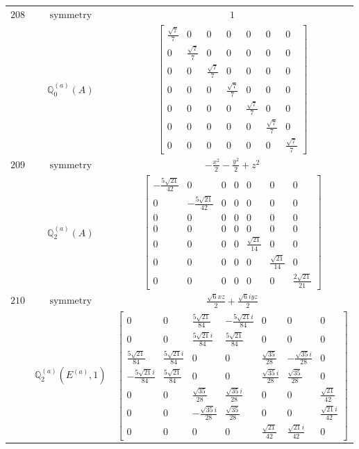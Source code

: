 \documentclass[fleqn,8pt,landscape]{jsarticle}
\begin{document}
\begin{longtable}{ccc}
$ 208 $ & $ \text{symmetry} $ & $ 1 $ \\
$  $ & $ \mathbb{Q}_{0}^{(a)}(A) $ & $ \begin{bmatrix} \frac{\sqrt{7}}{7} & 0 & 0 & 0 & 0 & 0 & 0 \\ 0 & \frac{\sqrt{7}}{7} & 0 & 0 & 0 & 0 & 0 \\ 0 & 0 & \frac{\sqrt{7}}{7} & 0 & 0 & 0 & 0 \\ 0 & 0 & 0 & \frac{\sqrt{7}}{7} & 0 & 0 & 0 \\ 0 & 0 & 0 & 0 & \frac{\sqrt{7}}{7} & 0 & 0 \\ 0 & 0 & 0 & 0 & 0 & \frac{\sqrt{7}}{7} & 0 \\ 0 & 0 & 0 & 0 & 0 & 0 & \frac{\sqrt{7}}{7} \end{bmatrix} $ \\ \hline
$ 209 $ & $ \text{symmetry} $ & $ - \frac{x^{2}}{2} - \frac{y^{2}}{2} + z^{2} $ \\
$  $ & $ \mathbb{Q}_{2}^{(a)}(A) $ & $ \begin{bmatrix} - \frac{5 \sqrt{21}}{42} & 0 & 0 & 0 & 0 & 0 & 0 \\ 0 & - \frac{5 \sqrt{21}}{42} & 0 & 0 & 0 & 0 & 0 \\ 0 & 0 & 0 & 0 & 0 & 0 & 0 \\ 0 & 0 & 0 & 0 & 0 & 0 & 0 \\ 0 & 0 & 0 & 0 & \frac{\sqrt{21}}{14} & 0 & 0 \\ 0 & 0 & 0 & 0 & 0 & \frac{\sqrt{21}}{14} & 0 \\ 0 & 0 & 0 & 0 & 0 & 0 & \frac{2 \sqrt{21}}{21} \end{bmatrix} $ \\ \hline
$ 210 $ & $ \text{symmetry} $ & $ \frac{\sqrt{6} x z}{2} + \frac{\sqrt{6} i y z}{2} $ \\
$  $ & $ \mathbb{Q}_{2}^{(a)}(E^{(a)},1) $ & $ \begin{bmatrix} 0 & 0 & \frac{5 \sqrt{21}}{84} & - \frac{5 \sqrt{21} i}{84} & 0 & 0 & 0 \\ 0 & 0 & \frac{5 \sqrt{21} i}{84} & \frac{5 \sqrt{21}}{84} & 0 & 0 & 0 \\ \frac{5 \sqrt{21}}{84} & \frac{5 \sqrt{21} i}{84} & 0 & 0 & \frac{\sqrt{35}}{28} & - \frac{\sqrt{35} i}{28} & 0 \\ - \frac{5 \sqrt{21} i}{84} & \frac{5 \sqrt{21}}{84} & 0 & 0 & \frac{\sqrt{35} i}{28} & \frac{\sqrt{35}}{28} & 0 \\ 0 & 0 & \frac{\sqrt{35}}{28} & \frac{\sqrt{35} i}{28} & 0 & 0 & \frac{\sqrt{21}}{42} \\ 0 & 0 & - \frac{\sqrt{35} i}{28} & \frac{\sqrt{35}}{28} & 0 & 0 & \frac{\sqrt{21} i}{42} \\ 0 & 0 & 0 & 0 & \frac{\sqrt{21}}{42} & \frac{\sqrt{21} i}{42} & 0 \end{bmatrix} $ \\ \hline

\end{longtable}
\end{document}
